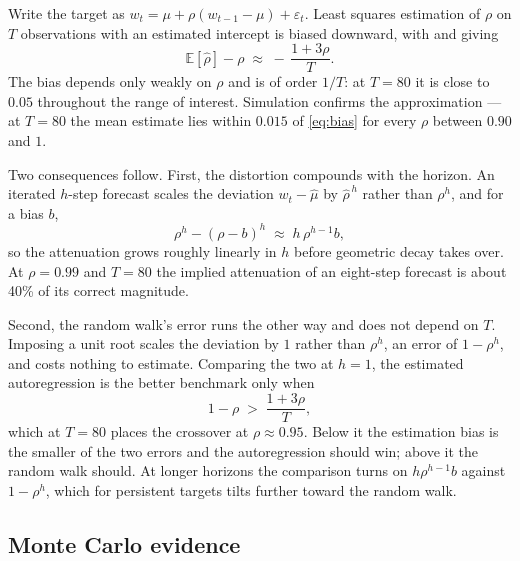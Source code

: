 \documentclass[12pt]{article}
\begin{document}
Write the target as $w_t = \mu + \rho(w_{t-1}-\mu) + \varepsilon_t$. Least
squares estimation of $\rho$ on $T$ observations with an estimated intercept is
biased downward, with \citet{marriott1954} and \citet{kendall1954} giving
\begin{equation}
\mathbb{E}[\hat\rho] - \rho \;\approx\; -\,\frac{1+3\rho}{T} .
\label{eq:bias}
\end{equation}
The bias depends only weakly on $\rho$ and is of order $1/T$: at $T = 80$ it is
close to $0.05$ throughout the range of interest. Simulation confirms the
approximation --- at $T = 80$ the mean estimate lies within $0.015$ of
\eqref{eq:bias} for every $\rho$ between $0.90$ and $1$.

Two consequences follow. First, the distortion compounds with the horizon. An
iterated $h$-step forecast scales the deviation $w_t - \hat\mu$ by
$\hat\rho^{\,h}$ rather than $\rho^h$, and for a bias $b$,
\begin{equation}
\rho^h - (\rho-b)^h \;\approx\; h\,\rho^{h-1} b ,
\end{equation}
so the attenuation grows roughly linearly in $h$ before geometric decay takes
over. At $\rho = 0.99$ and $T = 80$ the implied attenuation of an eight-step
forecast is about 40\% of its correct magnitude.

Second, the random walk's error runs the other way and does not depend on $T$.
Imposing a unit root scales the deviation by $1$ rather than $\rho^h$, an error
of $1-\rho^h$, and costs nothing to estimate. Comparing the two at $h = 1$, the
estimated autoregression is the better benchmark only when
\begin{equation}
1-\rho \;>\; \frac{1+3\rho}{T} ,
\label{eq:crossover}
\end{equation}
which at $T = 80$ places the crossover at $\rho \approx 0.95$. Below it the
estimation bias is the smaller of the two errors and the autoregression should
win; above it the random walk should. At longer horizons the comparison turns
on $h\rho^{h-1}b$ against $1-\rho^h$, which for persistent targets tilts
further toward the random walk.

\subsection{Monte Carlo evidence}
\end{document}
